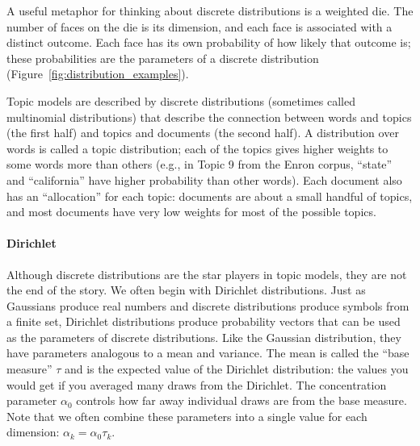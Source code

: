 A useful metaphor for thinking about discrete distributions is a weighted die.
The number of faces on the die is its dimension, and each face is associated with a distinct
outcome.  Each face has its own probability of how likely that outcome is;
these probabilities are the parameters of a discrete distribution
(Figure~\ref{fig:distribution_examples}).

Topic models are described by discrete distributions (sometimes called
multinomial distributions) that describe the connection between words and topics (the first half) and topics and documents (the second half).  A distribution
over words is called a topic distribution; each of the topics gives
higher weights to some words more than others (e.g., in Topic 9 from
the Enron corpus, ``state'' and ``california'' have higher probability
than other words).  Each document also has an ``allocation'' for each
topic: documents are about a small handful of topics, and most
documents have very low weights for most of the possible topics.

\paragraph{Dirichlet}

Although discrete distributions are the star players in topic models, they are
not the end of the story.  We often begin with Dirichlet distributions.
Just as Gaussians produce real numbers and discrete distributions produce symbols from a finite set, Dirichlet distributions produce probability vectors that can be used as the parameters of discrete distributions.
Like the Gaussian distribution, they have parameters analogous to a mean and
variance.  The mean is called the ``base measure'' $\tau$ and is the expected
value of the Dirichlet distribution: the values you would get if you averaged many draws from the
Dirichlet.  The concentration parameter $\alpha_0$ controls how far away individual draws are from the base measure.
Note that we often combine these parameters into a single value for each dimension: $\alpha_k = \alpha_0 \tau_k$.

